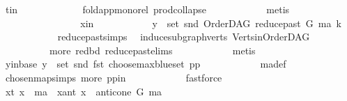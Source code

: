 \begin{isabellebody}
\ t{\isacharunderscore}{\kern0pt}in\ \isanewline
\ \ \ \ \ \ \ \ \ \ \isamarkupfalse%
\ fold{\isacharunderscore}{\kern0pt}app{\isacharunderscore}{\kern0pt}mono{\isacharunderscore}{\kern0pt}rel\ prod{\isachardot}{\kern0pt}collapse\isanewline
\ \ \ \ \ \ \ \ \ \ \isamarkupfalse%
\ metis\ \ \ \ \ \ \ \isanewline
\ \ \ \ \ \ \isamarkupfalse%
\isanewline
\ \ \ \ \ \ \ \ \isamarkupfalse%
\ x{\isacharunderscore}{\kern0pt}in\isanewline
\ \ \ \ \ \ \ \ \isamarkupfalse%
\ \isamarkupfalse%
\ {\isachardoublequoteopen}y\ {\isasymin}\ set\ {\isacharparenleft}{\kern0pt}snd\ {\isacharparenleft}{\kern0pt}OrderDAG\ {\isacharparenleft}{\kern0pt}reduce{\isacharunderscore}{\kern0pt}past\ G\ ma{\isacharparenright}{\kern0pt}\ k{\isacharparenright}{\kern0pt}{\isacharparenright}{\kern0pt}{\isachardoublequoteclose}\isanewline
\ \ \ \ \ \ \ \ \ \ \isamarkupfalse%
\ reduce{\isacharunderscore}{\kern0pt}past{\isachardot}{\kern0pt}simps\ \isamarkupfalse%
\ induce{\isacharunderscore}{\kern0pt}subgraph{\isacharunderscore}{\kern0pt}verts\ Verts{\isacharunderscore}{\kern0pt}in{\isacharunderscore}{\kern0pt}OrderDAG\ \isanewline
\ \ \ \ \ \ \ \ \ \ more\ red{\isacharunderscore}{\kern0pt}bd\ reduce{\isacharunderscore}{\kern0pt}past{\isachardot}{\kern0pt}elims\isanewline
\ \ \ \ \ \ \ \ \ \ \isamarkupfalse%
\ {\isacharparenleft}{\kern0pt}metis{\isacharparenright}{\kern0pt}\isanewline
\ \ \ \ \ \ \ \ \isamarkupfalse%
\ \isamarkupfalse%
\ y{\isacharunderscore}{\kern0pt}in{\isacharunderscore}{\kern0pt}base{\isacharcolon}{\kern0pt}\ {\isachardoublequoteopen}y\ {\isasymin}\ set\ {\isacharparenleft}{\kern0pt}snd\ {\isacharparenleft}{\kern0pt}fst\ {\isacharparenleft}{\kern0pt}choose{\isacharunderscore}{\kern0pt}max{\isacharunderscore}{\kern0pt}blue{\isacharunderscore}{\kern0pt}set\ pp{\isacharparenright}{\kern0pt}{\isacharparenright}{\kern0pt}{\isacharparenright}{\kern0pt}{\isachardoublequoteclose}\isanewline
\ \ \ \ \ \ \ \ \ \ \isamarkupfalse%
\ ma{\isacharunderscore}{\kern0pt}def\ \isamarkupfalse%
\ chosen{\isacharunderscore}{\kern0pt}map{\isacharunderscore}{\kern0pt}simps{\isacharparenleft}{\kern0pt}{}{\isacharparenright}{\kern0pt}\ more\ pp{\isacharunderscore}{\kern0pt}in\isanewline
\ \ \ \ \ \ \ \ \ \ \isamarkupfalse%
\ fastforce\ \isanewline
\ \ \ \ \ \ \ \ \isamarkupfalse%
\ {\isacharparenleft}{\kern0pt}x{\isacharunderscore}{\kern0pt}t{\isacharparenright}{\kern0pt}\ {\isachardoublequoteopen}x\ {\isacharequal}{\kern0pt}\ ma{\isachardoublequoteclose}\ {\isacharbar}{\kern0pt}\ {\isacharparenleft}{\kern0pt}x{\isacharunderscore}{\kern0pt}ant{\isacharparenright}{\kern0pt}\ {\isachardoublequoteopen}x\ {\isasymin}\ anticone\ G\ ma{\isachardoublequoteclose}\ \isamarkupfalse%

\end{isabellebody}

